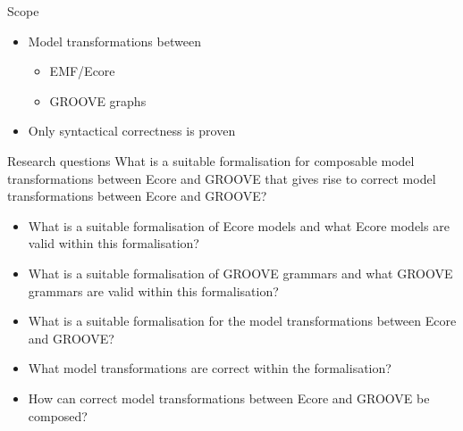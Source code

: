 
\begin{frame}{Scope}
    \begin{itemize}
        \item Model transformations between
        \begin{itemize}
            \item EMF/Ecore
            \item GROOVE graphs
        \end{itemize}
        \item Only syntactical correctness is proven
    \end{itemize}
\end{frame}


\begin{frame}{Research questions}
    What is a suitable formalisation for composable model transformations between Ecore and GROOVE that gives rise to correct model transformations between Ecore and GROOVE?
    \pause
    \begin{itemize}
        \item What is a suitable formalisation of Ecore models and what Ecore models are valid within this formalisation? 
        \item What is a suitable formalisation of GROOVE grammars and what GROOVE grammars are valid within this formalisation? 
        \pause
        \item What is a suitable formalisation for the model transformations between Ecore and GROOVE?
        \item What model transformations are correct within the formalisation?
        \pause
        \item How can correct model transformations between Ecore and GROOVE be composed?
    \end{itemize}
\end{frame}

